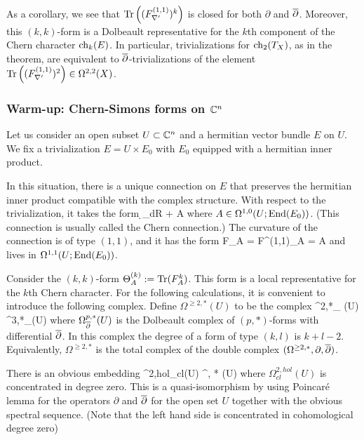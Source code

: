 As a corollary, we see that $\Tr \left((F_{\nabla'}^{(1,1)})^k\right)$ is closed for both $\partial$ and $\overline{\partial}$. 
Moreover, this $(k,k)$-form is a Dolbeault representative for the
$k$th component of the Chern character ${\rm ch}_k(E)$. In particular, trivializations for ${\rm ch}_2(T_X)$, as in the theorem, 
are equivalent to $\overline{\partial}$-trivializations of the element
$\Tr\left( (F_{\nabla '}^{(1,1)})^2 \right) \in \Omega^{2,2}(X)$. 

\subsubsection{Warm-up: Chern-Simons forms on $\mathbb C^n$}

\def\CS{{\rm CS}}
\def\Tr{{\rm Tr}}

Let us consider an open subset $U \subset \mathbb C^n$ and a hermitian vector
bundle $E$ on $U$. We fix a trivialization $E = U \times E_0$ with $E_0$
equipped with a hermitian inner product. 


In this situation, there is a unique connection on $E$ 
that preserves the hermitian inner product compatible with the complex structure. 
With respect to the trivialization, it takes the form
\ben
\d_{dR} + A 
\een
where $A \in \Omega^{1,0}(U ; {\rm End}(E_0))$. 
(This connection is usually called the Chern connection.)  
The curvature of the connection is of type $(1,1)$, and it has the form
\ben
F_A = F^{(1,1)}_A = \dbar A 
\een
and lives in $\Omega^{1,1}(U ; {\rm End}(E_0))$.

Consider the $(k,k)$-form $\Theta^{(k)}_A := \Tr (F_A^k)$. 
This form is a local representative for the $k$th Chern character. 
For the following calculations, it is convenient to introduce the following complex. 
Define $\Omega^{\geq 2, *} (U)$ to be the complex
\ben
\Omega^{2,*}_{\dbar} (U) \xto{\partial} \Omega^{3,*}_{\dbar}(U) \xto{\partial} \cdots
\een
where $\Omega^{p,*}_{\overline{\partial}} (U)$ is the Dolbeault complex of
$(p,*)$-forms with differential $\overline{\partial}$. In this complex the degree of a form of type
$(k,l)$ is $k+l - 2$. Equivalently, $\Omega^{\geq 2, *}$ is the total complex of the
double complex $(\Omega^{\geq 2, *}, \partial, \overline{\partial})$. 

There is an obvious embedding
\ben
\Omega^{2,hol}_{cl}(U) \hookrightarrow \Omega^{, *} (U)
\een 
where $\Omega^{2,hol}_{cl}(U)$ is concentrated in degree zero. This is a quasi-isomorphism by using Poincar\'e lemma for the operators
$\partial$ and $\overline{\partial}$ for the open set
$U$ together with the obvious spectral sequence. (Note that the left hand side is concentrated in cohomological
degree zero)

